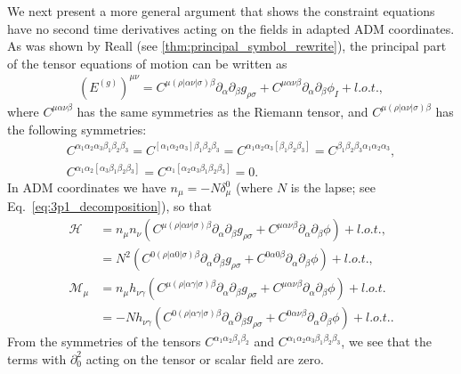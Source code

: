 \documentclass{ws-ijmpd}
\begin{document}
We next present a more general argument that shows
the constraint equations have no second time derivatives
acting on the fields in adapted ADM coordinates.
As was shown by Reall\cite{Reall:2021voz} 
(see \ref{thm:principal_symbol_rewrite}),
the principal part of the tensor equations of motion can be written as
\begin{align}
   \left(E^{(g)}\right)^{\mu\nu}
   =
   C^{\mu(\rho|\alpha\nu|\sigma)\beta}
   \partial_{\alpha}\partial_{\beta}g_{\rho\sigma}
   +
   C^{\mu\alpha\nu\beta}
   \partial_{\alpha}\partial_{\beta}\phi_I
   +
   l.o.t.
   ,
\end{align}
where $C^{\mu\alpha\nu\beta}$ has the same symmetries as the Riemann
tensor, and $C^{\mu(\rho|\alpha\nu|\sigma)\beta}$ has the following symmetries:
\begin{subequations}
\begin{align}
   C^{\alpha_1\alpha_2\alpha_3\beta_1\beta_2\beta_3}
   =
   C^{[\alpha_1\alpha_2\alpha_3]\beta_1\beta_2\beta_3}
   =
   C^{\alpha_1\alpha_2\alpha_3[\beta_1\beta_2\beta_3]}
   =
   C^{\beta_1\beta_2\beta_3\alpha_1\alpha_2\alpha_3}
   ,\\
   C^{\alpha_1\alpha_2[\alpha_3\beta_1\beta_2\beta_3]}
   = 
   C^{\alpha_1[\alpha_2\alpha_3\beta_1\beta_2\beta_3]}
   =
   0
   .
\end{align}
\end{subequations}
In ADM coordinates we have $n_{\mu}=-N\delta_{\mu}^0$ (where $N$ is the lapse;
see Eq.~\eqref{eq:3p1_decomposition}), so that 
\begin{subequations}
\begin{align}
   \mathcal{H}
   &=
   n_{\mu}n_{\nu}
   \left(
      C^{\mu(\rho|\alpha\nu|\sigma)\beta}
      \partial_{\alpha}\partial_{\beta}g_{\rho\sigma}
      +
      C^{\mu\alpha\nu\beta}
      \partial_{\alpha}\partial_{\beta}\phi
   \right)
   +
   l.o.t.
   ,\nonumber\\
   &=
   N^2
   \left(
      C^{0(\rho|\alpha0|\sigma)\beta}
      \partial_{\alpha}\partial_{\beta}g_{\rho\sigma}
      +
      C^{0\alpha0\beta}
      \partial_{\alpha}\partial_{\beta}\phi
   \right)
   +
   l.o.t.
   ,\\ 
   \mathcal{M}_{\mu}
   &=
   n_{\mu}h_{\nu\gamma}
   \left(
      C^{\mu(\rho|\alpha\gamma|\sigma)\beta}
      \partial_{\alpha}\partial_{\beta}g_{\rho\sigma}
      +
      C^{\mu\alpha\nu\beta}
      \partial_{\alpha}\partial_{\beta}\phi
   \right)
   +
   l.o.t.
   \nonumber\\
   &=
   -Nh_{\nu\gamma}
   \left(
      C^{0(\rho|\alpha\gamma|\sigma)\beta}
      \partial_{\alpha}\partial_{\beta}g_{\rho\sigma}
      +
      C^{0\alpha\nu\beta}
      \partial_{\alpha}\partial_{\beta}\phi
   \right)
   +
   l.o.t.
   .
\end{align}
\end{subequations}
From the symmetries of the tensors
$C^{\alpha_1\alpha_2\beta_1\beta_2}$ and 
$C^{\alpha_1\alpha_2\alpha_3\beta_1\beta_2\beta_3}$,
we see that the terms with $\partial_0^2$ acting on the tensor
or scalar field are zero.
\end{document}
